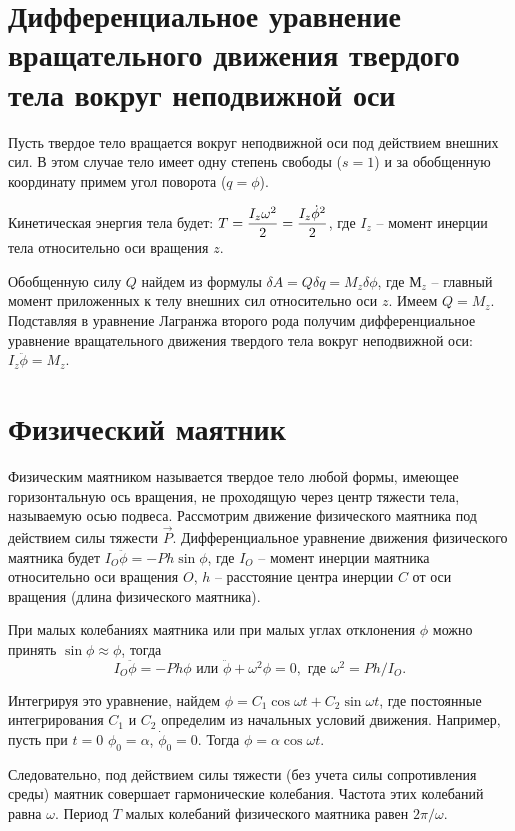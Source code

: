 \section{Дифференциальное уравнение вращательного движения твердого тела вокруг
неподвижной оси}
Пусть твердое тело вращается вокруг неподвижной оси под действием внешних сил.
В этом случае тело имеет одну степень свободы (\( s = 1 \)) и за обобщенную
координату примем угол поворота (\( q = \phi \)).

Кинетическая энергия тела будет:
\( \displaystyle T = \frac{I_z\omega^2}{2} = \frac{I_z\dot{\phi}^2}{2} \), 
где \( I_z \) -- момент инерции тела относительно оси вращения \( z \).

Обобщенную силу \( Q \) найдем из формулы
\( \delta A = Q\delta q = M_z\delta\phi \), где \( М_z \) -- главный момент
приложенных к телу внешних сил относительно оси \( z \). Имеем \( Q = M_z \).
Подставляя в уравнение Лагранжа второго рода получим дифференциальное уравнение
вращательного движения твердого тела вокруг неподвижной оси:
\( I_z\ddot{\phi} = M_z \).

\section{Физический маятник}
Физическим маятником называется твердое тело любой формы, имеющее горизонтальную
ось вращения, не проходящую через центр тяжести тела, называемую осью подвеса.
Рассмотрим движение физического маятника под действием силы тяжести
\( \vec{P} \). Дифференциальное уравнение движения физического маятника будет
\( I_O\ddot{\phi} = -Ph\sin\phi \), где \( I_O \) -- момент инерции маятника
относительно оси вращения \( O \), \( h \) -- расстояние центра инерции \( C \)
от оси вращения (длина физического маятника).

При малых колебаниях маятника или при малых углах отклонения \( \phi \) можно
принять \( \sin\phi \approx \phi \), тогда
\[
    I_O\ddot{\phi} = -Ph\phi \text{ или } \ddot{\phi} + \omega^2\phi = 0,
    \text{ где } \omega^2 = Ph/I_O.
\]

Интегрируя это уравнение, найдем \( \phi = C_1\cos\omega t + C_2\sin\omega t \),
где постоянные интегрирования \( C_1 \) и \( C_2 \) определим из начальных
условий движения. Например, пусть при \( t = 0 \) \( \phi_0 = \alpha \),
\( \dot{\phi}_0 = 0 \). Тогда \( \phi =\alpha\cos\omega t \).

Следовательно, под действием силы тяжести (без учета силы сопротивления среды)
маятник совершает гармонические колебания. Частота этих колебаний равна
\( \omega \). Период \( T \) малых колебаний физического маятника равен
\( 2\pi/\omega \).

\newpage
